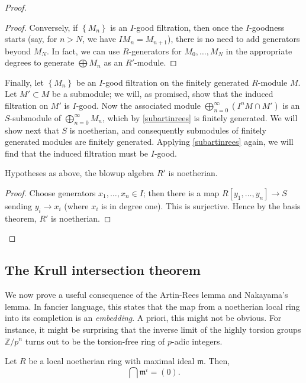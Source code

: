 \begin{proof}
\begin{proof}
Conversely, if $\left\{M_n\right\}$ is an $I$-good filtration, then once the
$I$-goodness starts (say, for $n>N$, we have $IM_{n} = M_{n+1}$), there is no
need to add generators beyond $M_{N}$. In fact, we can use $R$-generators for
$M_0, \dots, M_N$ in the appropriate degrees to generate $\bigoplus M_n$ as an
$R'$-module.
\end{proof}

Finally, let $\left\{M_n\right\}$ be an $I$-good filtration on the finitely
generated $R$-module $M$. Let $M' \subset M$ be a submodule; we will, as
promised, show that the  induced filtration on $M'$ is $I$-good.
Now the associated module $\bigoplus_{n=0}^{\infty} (I^n M \cap M') $
is an $S$-submodule of $\bigoplus_{n=0}^{\infty} M_n$, which
by \cref{subartinrees} is finitely generated. We will show next that $S$
is noetherian, and consequently submodules of finitely generated
modules are finitely generated. Applying \cref{subartinrees} again, we will find
that the induced filtration must be $I$-good.

\begin{lemma} 
Hypotheses as above,  the blowup algebra $R'$ is noetherian.
\end{lemma} 
\begin{proof} 
Choose generators $x_1, \dots, x_n \in I$; then there is a map $R[y_1, \dots,
y_n] \to S$ sending $y_i \to x_i $ (where $x_i$ is in degree one). This is surjective. Hence by the basis
theorem, $R'$ is noetherian.
\end{proof} 


\end{proof} 


\subsection{The Krull intersection theorem}

We now prove a useful consequence of the Artin-Rees lemma and Nakayama's
lemma. In fancier language, this states that the map from a noetherian local
ring into its
completion is an \emph{embedding}. A priori, this might not be obvious. For
instance, it might be surprising that the inverse limit of the highly torsion
groups $\mathbb{Z}/p^n$ turns out to be the torsion-free ring of $p$-adic
integers.

\begin{theorem}[Krull] Let $R$ be a local noetherian ring with maximal ideal
$\mathfrak{m}$. Then,
\[ \bigcap \mathfrak{m}^i = (0).  \]
\end{theorem} 


